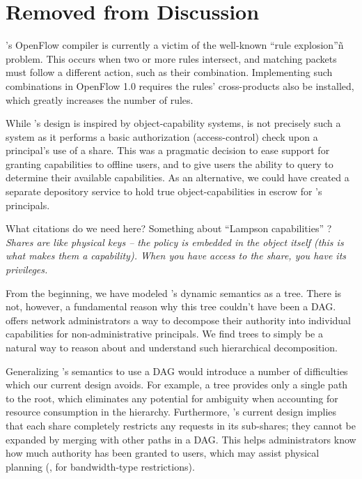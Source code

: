 \chapter{Removed from Discussion}

\sys's OpenFlow compiler is currently a victim of the well-known
``rule explosion''ñ problem. This occurs when two or more rules
intersect, and matching packets must follow a different action, such
as their combination. Implementing such combinations in OpenFlow 1.0
requires the rules' cross-products also be installed, which greatly
increases the number of rules.

While \sys's design is inspired by object-capability systems, \sys is
not precisely such a system as it performs a basic authorization
(access-control) check upon a principal's use of a share.  This was a
pragmatic decision to ease support for granting capabilities to
offline users, and to give users the ability to query \sys to
determine their available capabilities.  As an alternative, we could
have created a separate depository service to hold true
object-capabilities in escrow for \sys's principals.

{\color{red}What citations do we need here? Something about ``Lampson
  capabilities'' ?}  \emph{Shares are like physical keys -- the policy
  is embedded in the object itself (this is what makes them a
  capability). When you have access to the share, you have its
  privileges.}

From the beginning, we have modeled \sys's dynamic semantics as a
tree.  There is not, however, a fundamental reason why this tree
couldn't have been a DAG.  \sys offers network administrators a way to
decompose their authority into individual capabilities for
non-administrative principals. We find trees to simply be a natural
way to reason about and understand such hierarchical decomposition.

Generalizing \sys's semantics to use a DAG would introduce a number of
difficulties which our current design avoids. For example, a tree
provides only a single path to the root, which eliminates any
potential for ambiguity when accounting for resource consumption in
the hierarchy. Furthermore, \sys's current design implies that each
share completely restricts any requests in its sub-shares; they cannot
be expanded by merging with other paths in a DAG. This helps
administrators know how much authority has been granted to users,
which may assist physical planning (\eg, for bandwidth-type
restrictions).

